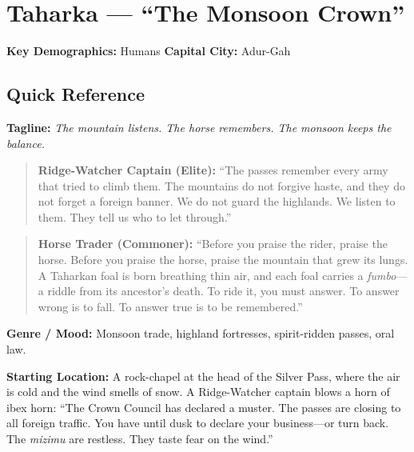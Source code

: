 \section{Taharka --- ``The Monsoon Crown''}
\label{chap:taharka}

\textbf{Key Demographics: } Humans
\textbf{Capital City: } Adur-Gah

\subsection*{Quick Reference}
\textbf{Tagline:} \textit{The mountain listens. The horse remembers. The monsoon keeps the balance.}

\begin{quote}
  \textbf{Ridge-Watcher Captain (Elite):}  
  ``The passes remember every army that tried to climb them. The mountains do not forgive haste, and they do not forget a foreign banner. We do not guard the highlands. We listen to them. They tell us who to let through.''
\end{quote}

\begin{quote}
  \textbf{Horse Trader (Commoner):}  
  ``Before you praise the rider, praise the horse. Before you praise the horse, praise the mountain that grew its lungs. A Taharkan foal is born breathing thin air, and each foal carries a \textit{fumbo}---a riddle from its ancestor's death. To ride it, you must answer. To answer wrong is to fall. To answer true is to be remembered.''
\end{quote}

\noindent\textbf{Genre / Mood:} Monsoon trade, highland fortresses, spirit-ridden passes, oral law.

\noindent\textbf{Starting Location:} A rock-chapel at the head of the Silver Pass, where the air is cold and the wind smells of snow. A Ridge-Watcher captain blows a horn of ibex horn: ``The Crown Council has declared a muster. The passes are closing to all foreign traffic. You have until dusk to declare your business---or turn back. The \textit{mizimu} are restless. They taste fear on the wind.''


